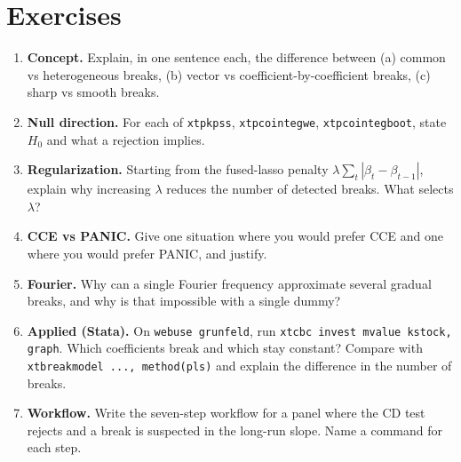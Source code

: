 \documentclass[11pt,a4paper]{article}
\newcommand{\cmd}[1]{\texttt{\textcolor{camber}{#1}}}
\theoremstyle{definition}
\begin{document}
\section{Exercises}
\begin{enumerate}[leftmargin=1.6em,itemsep=3pt]
 \item \textbf{Concept.} Explain, in one sentence each, the difference between (a) common vs
 heterogeneous breaks, (b) vector vs coefficient-by-coefficient breaks, (c) sharp vs smooth breaks.
 \item \textbf{Null direction.} For each of \cmd{xtpkpss}, \cmd{xtpcointegwe}, \cmd{xtpcointegboot},
 state $H_0$ and what a rejection implies.
 \item \textbf{Regularization.} Starting from the fused-lasso penalty $\lambda\sum_t|\beta_t-\beta_{t-1}|$,
 explain why increasing $\lambda$ reduces the number of detected breaks. What selects $\lambda$?
 \item \textbf{CCE vs PANIC.} Give one situation where you would prefer CCE and one where you would
 prefer PANIC, and justify.
 \item \textbf{Fourier.} Why can a single Fourier frequency approximate several gradual breaks, and why
 is that impossible with a single dummy?
 \item \textbf{Applied (Stata).} On \cmd{webuse grunfeld}, run \cmd{xtcbc invest mvalue kstock, graph}.
 Which coefficients break and which stay constant? Compare with \cmd{xtbreakmodel ..., method(pls)}
 and explain the difference in the number of breaks.
 \item \textbf{Workflow.} Write the seven-step workflow for a panel where the CD test rejects and a
 break is suspected in the long-run slope. Name a command for each step.
\end{enumerate}

\end{document}
